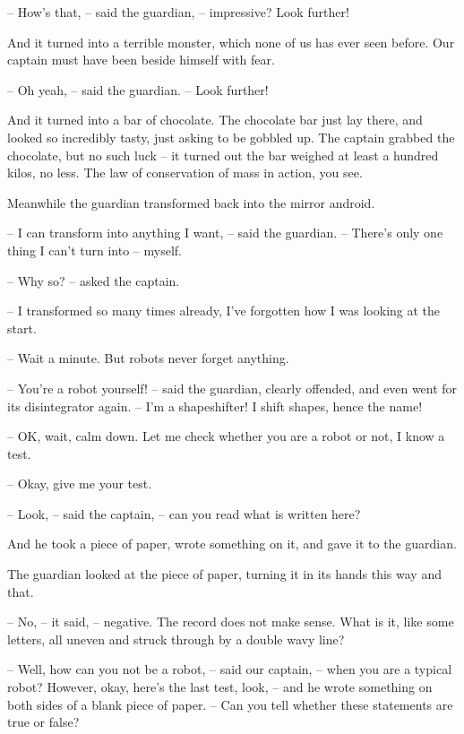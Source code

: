 \documentclass[ebook,oneside,final,openright]{memoir}
\begin{document}
– How’s that, – said the guardian, – impressive? Look further!\par
And it turned into a terrible monster, which none of us has ever seen before. Our captain must have been beside himself with fear.\par
– Oh yeah, – said the guardian. – Look further!\par
\par
And it turned into a bar of chocolate. The chocolate bar just lay there, and looked so incredibly tasty, just asking to be gobbled up. The captain grabbed the chocolate, but no such luck – it turned out the bar weighed at least a hundred kilos, no less. The law of conservation of mass in action, you see.\par
\par
Meanwhile the guardian transformed back into the mirror android.\par
– I can transform into anything I want, – said the guardian. – There’s only one thing I can’t turn into – myself.\par
– Why so? – asked the captain.\par
– I transformed so many times already, I’ve forgotten how I was looking at the start.\par
– Wait a minute. But robots never forget anything.\par
– You’re a robot yourself! – said the guardian, clearly offended, and even went for its disintegrator again. – I’m a shapeshifter! I shift shapes, hence the name!\par
– OK, wait, calm down. Let me check whether you are a robot or not, I know a test.\par
– Okay, give me your test.\par
– Look, – said the captain, – can you read what is written here?\par
And he took a piece of paper, wrote something on it, and gave it to the guardian.\par
The guardian looked at the piece of paper, turning it in its hands this way and that.\par
– No, – it said, – negative. The record does not make sense. What is it, like some letters, all uneven and struck through by a double wavy line?\par
– Well, how can you not be a robot, – said our captain, – when you are a typical robot? However, okay, here’s the last test, look, – and he wrote something on both sides of a blank piece of paper. – Can you tell whether these statements are true or false?\par
\end{document}
